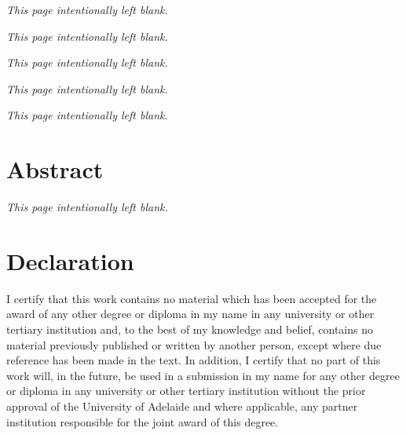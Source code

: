 \documentclass[twoside,12pt,a4paper]{report}
\makeatletter
\newcommand*{\intentionallyblankpage}{
  \vspace*{\fill}
  {\centering \textit{This page intentionally left blank.} \par}
  \vspace{\fill}}
\renewcommand*{\cleardoublepage}{\clearpage\if@twoside \ifodd\c@page\else
  \intentionallyblankpage
  \newpage
  \if@twocolumn\hbox{}\newpage\fi\fi\fi}
\makeatother
\begin{document}


\setcounter{page}{2}
\intentionallyblankpage
\newpage
\intentionallyblankpage
\cleardoublepage
\tableofcontents

\glsaddall
\newpage
\intentionallyblankpage
\printglossaries
{}

\glsresetall
\cleardoublepage
\chapter*{Abstract}

\lipsum[1]




% 



\cleardoublepage
\chapter*{Declaration}

I certify that this work contains no material which has 
been accepted for the award of any other degree or 
diploma in my name in any university or other tertiary 
institution and, to the best of my knowledge and 
belief, contains no material previously published or 
written by another person, except where due reference 
has been made in the text. 
In addition, I certify that no part of this work will, 
in the future, be used in a submission in my name for 
any other degree or diploma in any university or other 
tertiary institution without the prior approval of the 
University of Adelaide and where applicable, any 
partner institution responsible for the joint award of 
this degree.
\end{document}
